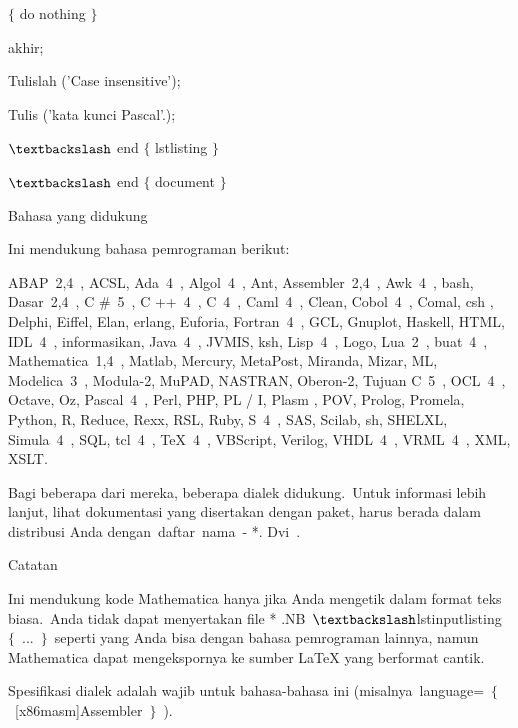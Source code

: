  $ \{ $ do nothing $ \} $\par

 akhir;\par

 Tulislah ('Case insensitive');\par

 Tulis ('kata kunci Pascal'.);\par

 $\textbackslash$ end $ \{ $ lstlisting $ \} $\par

 $\textbackslash$ end $ \{ $ document $ \} $\par

Bahasa yang didukung \par

Ini mendukung bahasa pemrograman berikut:\par

ABAP 2,4 , ACSL, Ada 4 , Algol 4 , Ant, Assembler 2,4 , Awk 4 , bash, Dasar 2,4 , C $\#$ 5 , C ++ 4 , C 4 , Caml 4 , Clean, Cobol 4 , Comal, csh , Delphi, Eiffel, Elan, erlang, Euforia, Fortran 4 , GCL, Gnuplot, Haskell, HTML, IDL 4 , informasikan, Java 4 , JVMIS, ksh, Lisp 4 , Logo, Lua 2 , buat 4 , Mathematica 1,4 , Matlab, Mercury, MetaPost, Miranda, Mizar, ML, Modelica 3 , Modula-2, MuPAD, NASTRAN, Oberon-2, Tujuan C 5 , OCL 4 , Octave, Oz, Pascal 4 , Perl, PHP, PL / I, Plasm , POV, Prolog, Promela, Python, R, Reduce, Rexx, RSL, Ruby, S 4 , SAS, Scilab, sh, SHELXL, Simula 4 , SQL, tcl 4 , TeX 4 , VBScript, Verilog, VHDL 4 , VRML 4 , XML, XSLT.\par

Bagi beberapa dari mereka, beberapa dialek didukung. Untuk informasi lebih lanjut, lihat dokumentasi yang disertakan dengan paket, harus berada dalam distribusi Anda dengan daftar nama - *. Dvi .\par

Catatan\par

Ini mendukung kode Mathematica hanya jika Anda mengetik dalam format teks biasa. Anda tidak dapat menyertakan file * .NB $\textbackslash$lstinputlisting $ \{ $ ... $ \} $ seperti yang Anda bisa dengan bahasa pemrograman lainnya, namun Mathematica dapat mengekspornya ke sumber LaTeX yang berformat cantik.\par

Spesifikasi dialek adalah wajib untuk bahasa-bahasa ini (misalnya language= $ \{ $ [x86masm]Assembler $ \} $ ).\par

